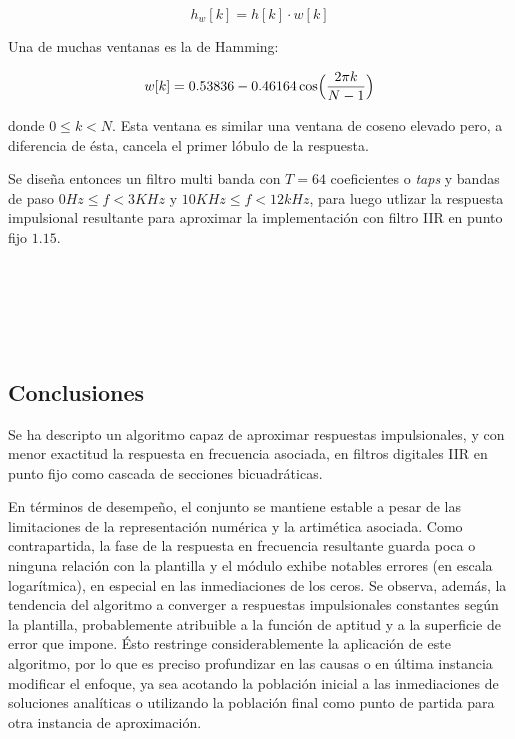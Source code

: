 \documentclass[11pt]{article}
\begin{document}
\[
h_w[k] = h[k] \cdot w[k]
\]

Una de muchas ventanas es la de Hamming:

\[
w[k] = 0.53836 - 0.46164 \cos\Bigl(\frac{2 \pi k}{N - 1}\Bigr)
\]

donde \(0 \leq k < N\). Esta ventana es similar una ventana de coseno
elevado pero, a diferencia de ésta, cancela el primer lóbulo de la
respuesta.

Se diseña entonces un filtro multi banda con \(T = 64\) coeficientes o
\emph{taps} y bandas de paso \(0 Hz \leq f < 3 KHz\) y
\(10 KHz \leq f < 12 kHz\), para luego utlizar la respuesta impulsional
resultante para aproximar la implementación con filtro IIR en punto fijo
\(1.15\).



    \begin{center}
    \end{center}
    { \hspace*{\fill} \\}
    

    \begin{center}
    \end{center}
    { \hspace*{\fill} \\}
    

    \begin{center}
    \end{center}
    { \hspace*{\fill} \\}
    
    \subsection{Conclusiones}\label{conclusiones}

Se ha descripto un algoritmo capaz de aproximar respuestas
impulsionales, y con menor exactitud la respuesta en frecuencia
asociada, en filtros digitales IIR en punto fijo como cascada de
secciones bicuadráticas.

En términos de desempeño, el conjunto se mantiene estable a pesar de las
limitaciones de la representación numérica y la artimética asociada.
Como contrapartida, la fase de la respuesta en frecuencia resultante
guarda poca o ninguna relación con la plantilla y el módulo exhibe
notables errores (en escala logarítmica), en especial en las
inmediaciones de los ceros. Se observa, además, la tendencia del
algoritmo a converger a respuestas impulsionales constantes según la
plantilla, probablemente atribuible a la función de aptitud y a la
superficie de error que impone. Ésto restringe considerablemente la
aplicación de este algoritmo, por lo que es preciso profundizar en las
causas o en última instancia modificar el enfoque, ya sea acotando la
población inicial a las inmediaciones de soluciones analíticas o
utilizando la población final como punto de partida para otra instancia
de aproximación.
\end{document}
